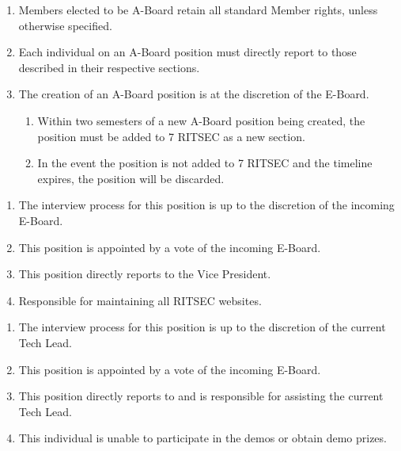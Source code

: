 

\begin{enumerate}
  \item Members elected to be A-Board retain all standard Member rights, unless otherwise specified. 
  \item Each individual on an A-Board position must directly report to those described in their respective sections.
  \item The creation of an A-Board position is at the discretion of the E-Board.
  \begin{enumerate}
    \item Within two semesters of a new A-Board position being created, the position must be added to 7 RITSEC as a new section.
    \item In the event the position is not added to 7 RITSEC and the timeline expires, the position will be discarded.
  \end{enumerate}
\end{enumerate}


\begin{enumerate}
  \item The interview process for this position is up to the discretion of the incoming E-Board. 
  \item This position is appointed by a vote of the incoming E-Board.
  \item This position directly reports to the Vice President. 
  \item Responsible for maintaining all RITSEC websites.
\end{enumerate}


\begin{enumerate}
  \item The interview process for this position is up to the discretion of the current Tech Lead.
  \item This position is appointed by a vote of the incoming E-Board.
  \item This position directly reports to and is responsible for assisting the current Tech Lead.
  \item This individual is unable to participate in the demos or obtain demo prizes.
\end{enumerate}

